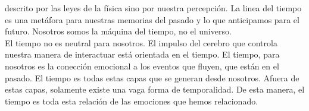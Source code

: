 \documentclass[12pt,a4paper]{report}
\begin{document}
\begin{enumerate}
{			descrito por las leyes de la física sino por nuestra percepción.
			La linea del tiempo es una metáfora para nuestras memorias del pasado y lo
			que anticipamos para el futuro. Nosotros somos la máquina del tiempo, no
			el universo.\\
			El tiempo no es neutral para nosotros. El impulso del cerebro que controla
			nuestra manera de interactuar está orientada en el tiempo. El tiempo, para
			nosotros es la conección emocional a los eventos que fluyen, que están en
			el pasado. El tiempo es todas estas capas que se generan desde nosotros.
			Afuera de estas capas, solamente existe una vaga forma de temporalidad.
			De esta manera, el tiempo es toda esta relación de las emociones que
			hemos relacionado.
		}
	\end{enumerate}
\end{document}
